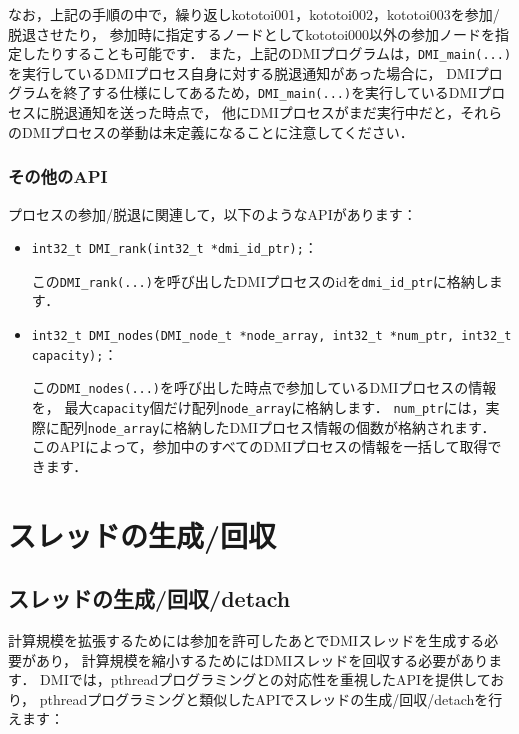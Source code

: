\documentclass[report,12pt]{jsbook}
\begin{document}
なお，上記の手順の中で，繰り返しkototoi001，kototoi002，kototoi003を参加/脱退させたり，
参加時に指定するノードとしてkototoi000以外の参加ノードを指定したりすることも可能です．
また，上記のDMIプログラムは，\texttt{DMI\_main(...)}を実行しているDMIプロセス自身に対する脱退通知があった場合に，
DMIプログラムを終了する仕様にしてあるため，\texttt{DMI\_main(...)}を実行しているDMIプロセスに脱退通知を送った時点で，
他にDMIプロセスがまだ実行中だと，それらのDMIプロセスの挙動は未定義になることに注意してください．


\subsubsection{その他のAPI}

プロセスの参加/脱退に関連して，以下のようなAPIがあります：

\begin{itemize}
\item \texttt{int32\_t DMI\_rank(int32\_t *dmi\_id\_ptr);}：
  
  この\texttt{DMI\_rank(...)}を呼び出したDMIプロセスのidを\texttt{dmi\_id\_ptr}に格納します．
\item \texttt{int32\_t DMI\_nodes(DMI\_node\_t *node\_array, int32\_t *num\_ptr, int32\_t capacity);}：
  
  この\texttt{DMI\_nodes(...)}を呼び出した時点で参加しているDMIプロセスの情報を，
  最大\texttt{capacity}個だけ配列\texttt{node\_array}に格納します．
  \texttt{num\_ptr}には，実際に配列\texttt{node\_array}に格納したDMIプロセス情報の個数が格納されます．
  このAPIによって，参加中のすべてのDMIプロセスの情報を一括して取得できます．
\end{itemize}

\section{スレッドの生成/回収}

\subsection{スレッドの生成/回収/detach}

計算規模を拡張するためには参加を許可したあとでDMIスレッドを生成する必要があり，
計算規模を縮小するためにはDMIスレッドを回収する必要があります．
DMIでは，pthreadプログラミングとの対応性を重視したAPIを提供しており，
pthreadプログラミングと類似したAPIでスレッドの生成/回収/detachを行えます：
\end{document}
